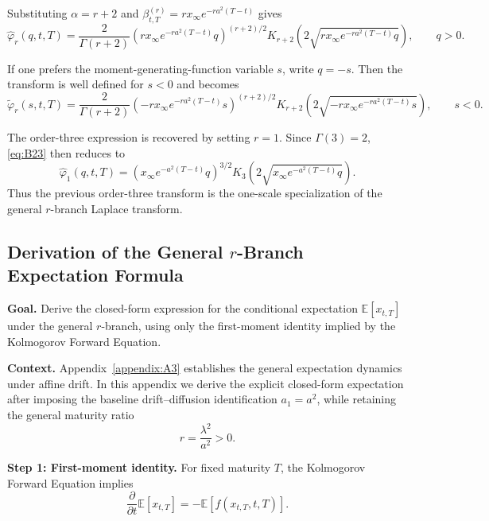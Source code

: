 \documentclass[12pt]{article}
\theoremstyle{statementstyle}
\begin{document}
\begin{appendices}
Substituting \(\alpha=r+2\) and \(\beta_{t,T}^{(r)}=r x_{\infty}e^{-ra^{2}(T-t)}\) gives
\begin{equation}
\boxed{
\widehat{\varphi}_{r}(q,t,T)
=
\frac{2}{\Gamma(r+2)}
\left(r x_{\infty}e^{-ra^{2}(T-t)}q\right)^{(r+2)/2}
K_{r+2}\!\left(
2\sqrt{r x_{\infty}e^{-ra^{2}(T-t)}q}
\right),
\qquad q>0.
}
\tag{B.2.3}\label{eq:B23}
\end{equation}

If one prefers the moment-generating-function variable \(s\), write \(q=-s\).
Then the transform is well defined for \(s<0\) and becomes
\begin{equation}
\boxed{
\widetilde{\varphi}_{r}(s,t,T)
=
\frac{2}{\Gamma(r+2)}
\left(-r x_{\infty}e^{-ra^{2}(T-t)}s\right)^{(r+2)/2}
K_{r+2}\!\left(
2\sqrt{-r x_{\infty}e^{-ra^{2}(T-t)}s}
\right),
\qquad s<0.
}
\tag{B.2.4}\label{eq:B24}
\end{equation}

The order-three expression is recovered by setting \(r=1\). Since \(\Gamma(3)=2\),
\eqref{eq:B23} then reduces to
\[
\widehat{\varphi}_{1}(q,t,T)
=
\left(x_{\infty}e^{-a^{2}(T-t)}q\right)^{3/2}
K_{3}\!\left(2\sqrt{x_{\infty}e^{-a^{2}(T-t)}q}\right).
\]
Thus the previous order-three transform is the one-scale specialization of the general
\(r\)-branch Laplace transform.

\subsection{Derivation of the General \(r\)-Branch Expectation Formula}
\label{appendix:B3}

\textbf{Goal.}
Derive the closed-form expression for the conditional expectation
\(\mathbb{E}[x_{t,T}]\) under the general \(r\)-branch, using only the first-moment identity
implied by the Kolmogorov Forward Equation.

\medskip
\noindent\textbf{Context.}
Appendix~\ref{appendix:A3} establishes the general expectation dynamics under affine
drift. In this appendix we derive the explicit closed-form expectation after imposing the
baseline drift--diffusion identification \(a_1=a^2\), while retaining the general maturity
ratio
\[
r=\frac{\lambda^2}{a^2}>0.
\]

\medskip
\noindent\textbf{Step 1: First-moment identity.}
For fixed maturity \(T\), the Kolmogorov Forward Equation implies
\begin{equation}
\frac{\partial}{\partial t}\mathbb{E}[x_{t,T}]
=
-\mathbb{E}\!\left[f(x_{t,T},t,T)\right].
\label{eq:B3_first_moment_identity}
\tag{B.3.1}
\end{equation}


\end{appendices}
\end{document}
